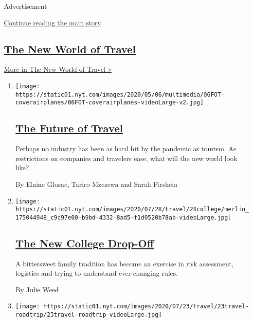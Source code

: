 Advertisement

\protect\hyperlink{after-mid1}{Continue reading the main story}

\hypertarget{the-new-world-of-travel}{%
\subsection{\texorpdfstring{\href{/spotlight/the-new-world-of-travel}{The
New World of
Travel}}{The New World of Travel}}\label{the-new-world-of-travel}}

\href{/spotlight/the-new-world-of-travel}{More in The New World of
Travel »}

\begin{enumerate}
\def\labelenumi{\arabic{enumi}.}
\item
  \texttt{[image: https://static01.nyt.com/images/2020/05/06/multimedia/06FOT-coverairplanes/06FOT-coverairplanes-videoLarge-v2.jpg]}

  \hypertarget{the-future-of-travel}{%
  \subsection{\texorpdfstring{\href{/interactive/2020/05/06/travel/coronavirus-travel-questions.html}{The
  Future of Travel}}{The Future of Travel}}\label{the-future-of-travel}}

  Perhaps no industry has been as hard hit by the pandemic as tourism.
  As restrictions on companies and travelers ease, what will the new
  world look like?

  By Elaine Glusac, Tariro Mzezewa and Sarah Firshein
\item
  \texttt{[image: https://static01.nyt.com/images/2020/07/28/travel/28college/merlin\_175044948\_c9c97e00-b9bd-4332-8ad5-f1d0520b78ab-videoLarge.jpg]}

  \hypertarget{the-new-college-drop-off}{%
  \subsection{\texorpdfstring{\href{/2020/07/29/travel/virus-college-travel-restrictions.html}{The
  New College
  Drop-Off}}{The New College Drop-Off}}\label{the-new-college-drop-off}}

  A bittersweet family tradition has become an exercise in risk
  assessment, logistics and trying to understand ever-changing rules.

  By Julie Weed
\item
  \texttt{[image: https://static01.nyt.com/images/2020/07/23/travel/23travel-roadtrip/23travel-roadtrip-videoLarge.jpg]}


\end{enumerate}
